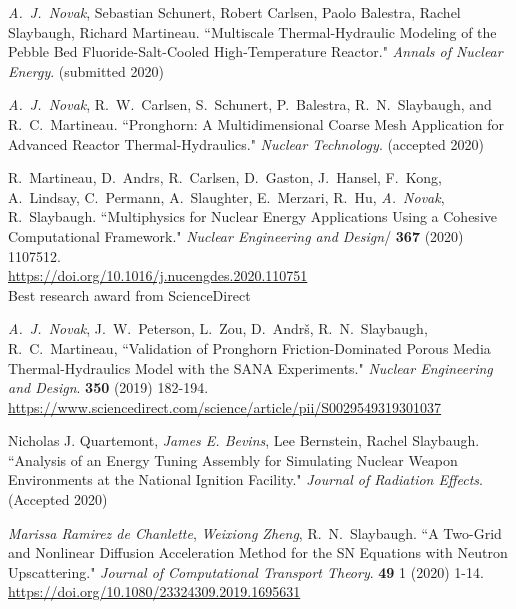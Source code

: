 \begin{bibsection}
\item \textit{A.\ J.\ Novak}, Sebastian Schunert, Robert Carlsen, Paolo Balestra,
Rachel Slaybaugh, Richard Martineau. ``Multiscale Thermal-Hydraulic Modeling of
the Pebble Bed Fluoride-Salt-Cooled High-Temperature Reactor." \textit{Annals of
Nuclear Energy}. (submitted 2020)

\item \textit{A.\ J.\ Novak}, R.\ W.\ Carlsen, S.\ Schunert, P.\ Balestra, R.\
N.\ Slaybaugh, and R.\ C.\ Martineau. ``Pronghorn: A Multidimensional Coarse
Mesh Application for Advanced Reactor Thermal-Hydraulics." \textit{Nuclear
Technology}. (accepted 2020)

\item R.\ Martineau, D.\ Andrs, R.\ Carlsen, D.\ Gaston, J.\
Hansel, F.\ Kong, A.\ Lindsay, C.\ Permann, A.\ Slaughter, E.\
Merzari, R.\ Hu, \textit{A.\ Novak}, R.\ Slaybaugh. ``Multiphysics for
Nuclear Energy Applications Using a Cohesive Computational Framework."
\textit{Nuclear Engineering and Design}/ \textbf{367} (2020) 1107512.\\
\url{https://doi.org/10.1016/j.nucengdes.2020.110751}\\
Best research award from ScienceDirect


\item \textit{A.\ J.\ Novak}, J.\ W.\ Peterson, L.\ Zou, D.\ Andr\v{s}, R.\ N.\ Slaybaugh, R.\ C.\ Martineau, ``Validation of Pronghorn Friction-Dominated Porous Media Thermal-Hydraulics Model with the SANA Experiments." \textit{Nuclear Engineering and Design}. \textbf{350} (2019) 182-194.\\
\url{https://www.sciencedirect.com/science/article/pii/S0029549319301037}

\item Nicholas J. Quartemont, \textit{James E. Bevins}, Lee Bernstein, Rachel
Slaybaugh. ``Analysis of an Energy Tuning Assembly for Simulating Nuclear Weapon
Environments at the National Ignition Facility." \textit{Journal of Radiation
Effects}. (Accepted 2020)

\item \textit{Marissa Ramirez de Chanlette}, \textit{Weixiong Zheng}, R.\ N.\
Slaybaugh. ``A Two-Grid and Nonlinear Diffusion Acceleration Method for the SN
Equations with Neutron Upscattering." \textit{Journal of Computational Transport
Theory}. \textbf{49} 1 (2020) 1-14. \\
\url{https://doi.org/10.1080/23324309.2019.1695631}


\end{bibsection}
